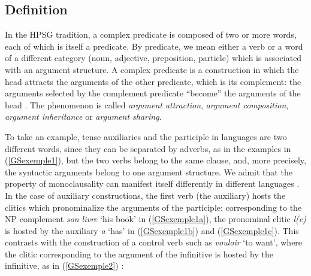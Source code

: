 
\subsection{Definition}\label{GSsection1.1}

In the HPSG tradition, a complex predicate is composed of two or more words, each of which is itself a predicate. By predicate, we mean either a verb or a word of a different category (noun, adjective, preposition, particle) which is associated with an argument structure. A complex predicate is a construction in which the head attracts the arguments of the other predicate, which is its complement: the arguments selected by the complement predicate ``become'' the arguments of the head \citep{HN89b, HN94a, HN98a}. The phenomenon is called \emph{argument attraction}, \emph{argument composition}, \emph{argument inheritance} or \emph{argument sharing}.

To take an example, tense auxiliaries and the participle in  languages are two different words, since they can be separated by adverbs, as in the  examples in (\ref{GSexemple1}), but the two verbs belong to the same clause, and, more precisely, the syntactic arguments belong to one argument structure. We admit that the property of monoclausality can manifest itself differently in different languages \citep[57--59]{Butt2010a}. In the case of  auxiliary constructions, the first verb (the auxiliary) hosts the clitics which pronominalize the arguments of the participle: corresponding to the NP complement \emph{son livre} `his book' in (\ref{GSexemple1a}), the pronominal clitic \emph{l(e)} is hosted by the auxiliary \emph{a} `has' in (\ref{GSexemple1b}) and (\ref{GSexemple1c}). This contrasts with the construction of a control verb such as \emph{vouloir} `to want', where the clitic corresponding to the argument of the infinitive is hosted by the infinitive, as in (\ref{GSexemple2}) \citep[from][406]{AG2002b-u}: 

\eal 
	\label{GSexemple1} 
	\label{GSexemple1a} 
		
